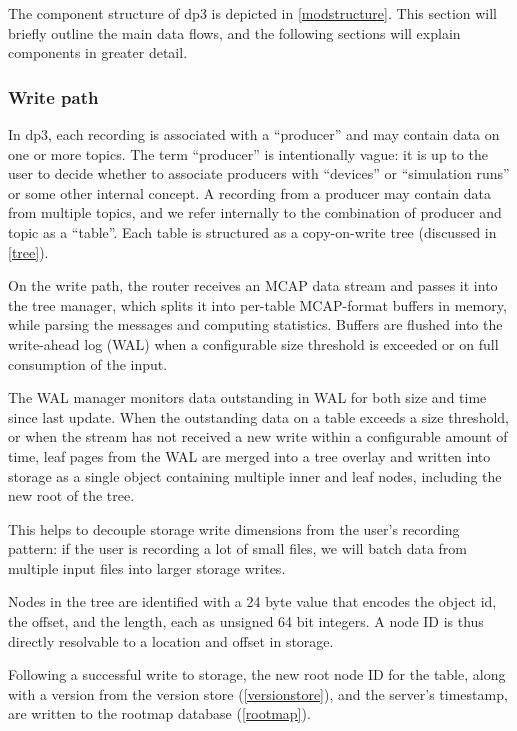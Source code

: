 \documentclass[9pt,twocolumn]{article}
\newcommand{\q}[1]{``#1''}
\begin{document}
    The component structure of dp3 is depicted in \autoref{modstructure}. This
    section will briefly outline the main data flows, and the following sections
    will explain components in greater detail.

    \subsubsection{Write path}
    In dp3, each recording is associated with a \q{producer} and may contain
    data on one or more topics. The term \q{producer} is intentionally vague:
    it is up to the user to decide whether to associate producers with
    \q{devices} or \q{simulation runs} or some other internal concept. A
    recording from a producer may contain data from multiple topics, and we
    refer internally to the combination of producer and topic as a \q{table}.
    Each table is structured as a copy-on-write tree (discussed in \ref{tree}).

    On the write path, the router receives an MCAP data stream and passes it
    into the tree manager, which splits it into per-table MCAP-format buffers
    in memory, while parsing the messages and computing statistics. Buffers are
    flushed into the write-ahead log (WAL) when a configurable size threshold
    is exceeded or on full consumption of the input.

    The WAL manager monitors data outstanding in WAL for both size and time
    since last update. When the outstanding data on a table exceeds a size
    threshold, or when the stream has not received a new write within a
    configurable amount of time, leaf pages from the WAL are merged into a tree
    overlay and written into storage as a single object containing multiple
    inner and leaf nodes, including the new root of the tree.

    This helps to decouple storage write dimensions from the user’s recording
    pattern: if the user is recording a lot of small files, we will batch data
    from multiple input files into larger storage writes.

    Nodes in the tree are identified with a 24 byte value that encodes the
    object id, the offset, and the length, each as unsigned 64 bit integers. A
    node ID is thus directly resolvable to a location and offset in storage.

    Following a successful write to storage, the new root node ID for the
    table, along with a version from the version store (\ref{versionstore}),
    and the server’s timestamp, are written to the rootmap database
    (\ref{rootmap}).
\end{document}
